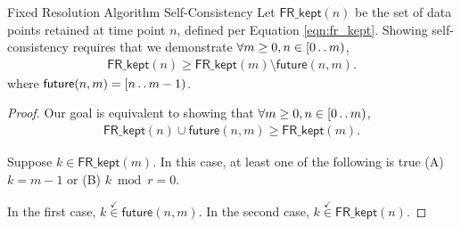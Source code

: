 \begin{theorem}{Fixed Resolution Algorithm Self-Consistency}
\label{thm:fixed-resolution-algo-self-consistency}
Let $\mathsf{FR\_kept}(n)$ be the set of data points retained at time point $n$, defined per Equation \ref{eqn:fr_kept}.
Showing self-consistency requires that we demonstrate $\forall m \geq 0, n \in [0 \mathinner {\ldotp \ldotp} m)$,
\begin{align*}
\mathsf{FR\_kept}(n)
\geq
\mathsf{FR\_kept}(m)
\setminus
\mathsf{future}(n, m).
\end{align*}
where $\mathsf{future}(n, m) = [n \mathinner {\ldotp \ldotp} m - 1)$.
\end{theorem}

\begin{proof}
\label{prf:fixed-resolution-algo-self-consistency}
Our goal is equivalent to showing that $\forall m \geq 0, n \in [0 \mathinner {\ldotp \ldotp} m)$,
\begin{align*}
\mathsf{FR\_kept}(n) \cup \mathsf{future}(n, m) \geq \mathsf{FR\_kept}(m).
\end{align*}

Suppose $k \in \mathsf{FR\_kept}(m)$.
In this case, at least one of the following is true (A) $k = m - 1$ or (B) $k \bmod r = 0$.

In the first case, $k \stackrel{\checkmark}{\in} \mathsf{future}(n, m)$.
In the second case, $k \stackrel{\checkmark}{\in} \mathsf{FR\_kept}(n)$.
\end{proof}
